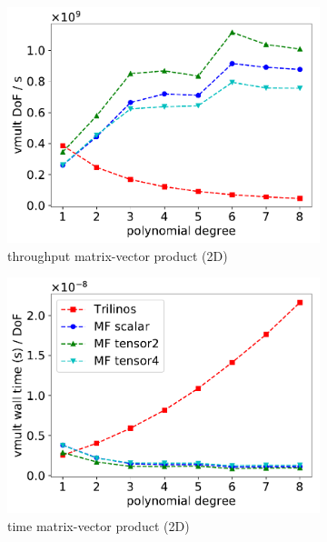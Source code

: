 \documentclass[AMA,STIX1COL]{WileyNJD-v2}
\begin{document}
\begin{figure}
  \centering
  \begin{subfigure}[b]{0.32\textwidth}
      \centering
      \includegraphics[width=\textwidth]{CSL_Munich_throughput2d.pdf}
      \caption{throughput matrix-vector product (2D)}
  \end{subfigure}
  \begin{subfigure}[b]{0.32\textwidth}
      \centering
      \includegraphics[width=\textwidth]{CSL_Munich_timing2d.pdf}
      \caption{time matrix-vector product (2D)}
      \label{fig:benchmark_miehe_CSL_vmult2}
  \end{subfigure}
  \begin{subfigure}[b]{0.32\textwidth}

\end{subfigure}
\end{figure}
\end{document}
